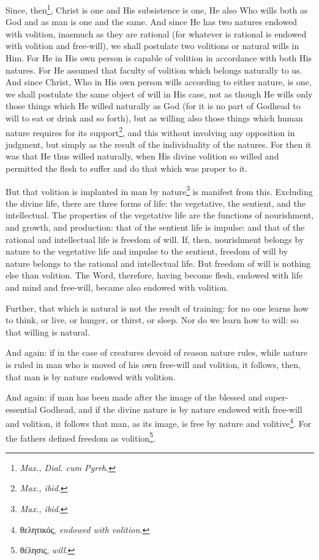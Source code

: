 Since, then\footnote{\emph{Max., Dial. cum Pyrrh}.}, Christ is one and His subsistence is one, He also Who wills both as God and as man is one and the same. And since He has two natures endowed with volition, inasmuch as they are rational (for whatever is rational is endowed with volition and free-will), we shall postulate two volitions or natural wills in Him. For He in His own person is capable of volition in accordance with both His natures. For He assumed that faculty of volition which belongs naturally to us. And since Christ, Who in His own person wills according to either nature, is one, we shall postulate the same object of will in His case, not as though He wills only those things which He willed naturally as God (for it is no part of Godhead to will to eat or drink and so forth), but as willing also those things which human nature requires for its support\footnote{\emph{Max., ibid}.}, and this without involving any opposition in judgment, but simply as the result of the individuality of the natures. For then it was that He thus willed naturally, when His divine volition so willed and permitted the flesh to suffer and do that which was proper to it.

But that volition is implanted in man by nature\footnote{\emph{Max., ibid}.} is manifest from this. Excluding the divine life, there are three forms of life: the vegetative, the sentient, and the intellectual. The properties of the vegetative life are the functions of nourishment, and growth, and production: that of the sentient life is impulse: and that of the rational and intellectual life is freedom of will. If, then, nourishment belongs by nature to the vegetative life and impulse to the sentient, freedom of will by nature belongs to the rational and intellectual life. But freedom of will is nothing else than volition. The Word, therefore, having become flesh, endowed with life and mind and free-will, became also endowed with volition.

Further, that which is natural is not the result of training: for no one learns how to think, or live, or hunger, or thirst, or sleep. Nor do we learn how to will: so that willing is natural.

And again: if in the case of creatures devoid of reason nature rules, while nature is ruled in man who is moved of his own free-will and volition, it follows, then, that man is by nature endowed with volition.

And again: if man has been made after the image of the blessed and super-essential Godhead, and if the divine nature is by nature endowed with free-will and volition, it follows that man, as its image, is free by nature and volitive\footnote{\textgreek{θελητικός}, \emph{endowed with volition.}}. For the fathers defined freedom as volition\footnote{\textgreek{θέλησις}, \emph{will}.}.

